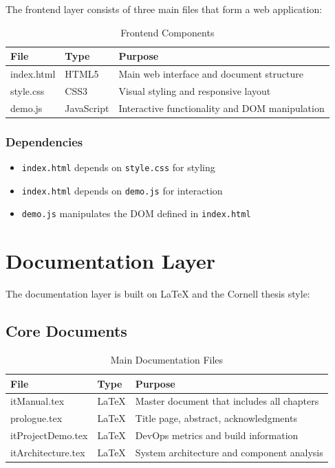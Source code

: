 The frontend layer consists of three main files that form a web application:

\begin{table}[h]
\centering
\begin{tabular}{|l|l|l|}
\hline
\textbf{File} & \textbf{Type} & \textbf{Purpose} \\
\hline
index.html & HTML5 & Main web interface and document structure \\
\hline
style.css & CSS3 & Visual styling and responsive layout \\
\hline
demo.js & JavaScript & Interactive functionality and DOM manipulation \\
\hline
\end{tabular}
\caption{Frontend Components}
\label{table:frontend-components}
\end{table}

\subsubsection{Dependencies}

\begin{itemize}
    \item \texttt{index.html} depends on \texttt{style.css} for styling
    \item \texttt{index.html} depends on \texttt{demo.js} for interaction
    \item \texttt{demo.js} manipulates the DOM defined in \texttt{index.html}
\end{itemize}

\section{Documentation Layer}
\label{sec:DocumentationLayer}

The documentation layer is built on LaTeX and the Cornell thesis style:

\subsection{Core Documents}

\begin{table}[h]
\centering
\begin{tabular}{|l|l|l|}
\hline
\textbf{File} & \textbf{Type} & \textbf{Purpose} \\
\hline
itManual.tex & LaTeX & Master document that includes all chapters \\
\hline
prologue.tex & LaTeX & Title page, abstract, acknowledgments \\
\hline
itProjectDemo.tex & LaTeX & DevOps metrics and build information \\
\hline
itArchitecture.tex & LaTeX & System architecture and component analysis \\
\hline
\end{tabular}
\caption{Main Documentation Files}
\label{table:doc-files}
\end{table}

